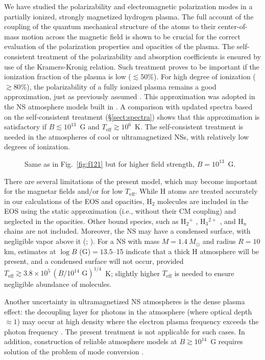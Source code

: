 \documentclass{emulateapj}
\newcommand{\Msun}{M_\odot}
\newcommand{\Teff}{T_\mathrm{eff}}
\begin{document}
We have studied the polarizability and electromagnetic polarization
modes in a partially ionized, strongly magnetized hydrogen plasma. The
full account of the coupling of the quantum mechanical structure of the
atoms to their center-of-mass motion across the magnetic field is shown
to be crucial for the correct evaluation of the polarization properties
and opacities of the plasma. The self-consistent treatment of the
polarizability and absorption coefficients is ensured by use of the
Kramers-Kronig relation. Such treatment proves to be important if the
ionization fraction of the plasma is low ($\lesssim50$\%). For high
degree of ionization ($\gtrsim 80$\%), the polarizability of a fully
ionized plasma remains a good approximation, just as previously assumed
\citep{PC03}. This approximation was adopted in the NS atmosphere
models built in \citet{hoetal03,Ho-COSPAR}. A comparison with updated
spectra based on the self-consistent treatment (\S\ref{sect:spectra})
shows that this approximation is satisfactory if $B\lesssim10^{13}$~G
and $\Teff\gtrsim10^6$~K. The self-consistent treatment is
needed in the atmospheres of cool or ultramagnetized NSs, 
with relatively low degrees of
ionization.

\begin{figure}
\caption{Same as in Fig.~\protect\ref{fig:f121}
but for higher field strength, $B=10^{13}$~G.
\label{fig:f131}}
\end{figure}

There are several limitations of the present model,
which may become important for the magnetar fields
and/or for low $\Teff$. 
While H atoms are treated accurately in our calculations of the 
EOS and opacities, H$_2$ molecules are included in the EOS 
using the static approximation (i.e., without their CM coupling)
and neglected in the opacities. Other bound species, such as
H$_2$$^+$ \citep[e.g.,][]{TurbLop03}, 
H$_3$$^{2+}$ \citep{LopTurb}, and
H$_n$ chains \citep*{LSS92} are not included.
Moreover, the NS may have a condensed surface, 
with negligible vapor above it
(\citealt{LS97}; \citealt{Lai01}).
For a NS with mass $M=1.4~\Msun$ and radius $R=10$ km,
estimates
at $\log B$ (G)$=13.5$--15
\citep[based on][]{PC04}
indicate that a thick H atmosphere will be present, and a condensed
surface will not occur, provided
$\Teff \gtrsim 3.8\times10^5\,(B/10^{14}\mbox{ G})^{1/4}$~K;
slightly higher $\Teff$ is needed to ensure
negligible abundance of molecules. 

Another uncertainty in ultramagnetized NS atmospheres
is the dense plasma effect: the decoupling layer for photons 
in the atmosphere (where optical depth $\approx1$) may occur
at high density where the electron plasma frequency
exceeds the photon frequency \citep[e.g.,][]{hoetal03,Lloyd03}.
The present treatment is not applicable for such cases.
In addition,
construction of reliable atmosphere models 
at $B\gtrsim 10^{14}$~G
requires solution
of the problem of mode conversion \citep{LaiHo03a}.
\end{document}
